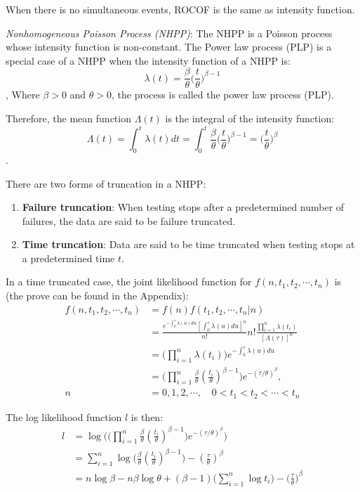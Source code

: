 \documentclass[12pt]{book}
\numberwithin{equation}{chapter}
\providecommand{\tightlist}{%
  \setlength{\itemsep}{0pt}\setlength{\parskip}{0pt}}
\begin{document}
When there is no simultaneous events, ROCOF is the same as intensity function.

\emph{Nonhomogeneous Poisson Process (NHPP)}: The NHPP is a Poisson process whose intensity function is non-constant. The Power law process (PLP) is a special case of a NHPP when the intensity function of a NHPP is:
\[\lambda(t) = \frac{\beta}{\theta}\bigg(\frac{t}{\theta}\bigg)^{\beta-1}\],
Where \(\beta > 0\) and \(\theta > 0\), the process is called the power law process (PLP).

Therefore, the mean function \(\Lambda(t)\) is the integral of the intensity function:
\[\Lambda(t) = \int_0^t \lambda(t)dt = \int_0^t \frac{\beta}{\theta}\bigg(\frac{t}{\theta}\bigg)^{\beta-1} = \bigg(\frac{t}{\theta}\bigg)^{\beta}\].

There are two forms of truncation in a NHPP:

\begin{enumerate}
\def\labelenumi{\arabic{enumi}.}
\tightlist
\item
  \textbf{Failure truncation}: When testing stops after a predetermined number of failures, the data are said to be failure truncated.
\item
  \textbf{Time truncation}: Data are said to be time truncated when testing stops at a predetermined time \(t\).
\end{enumerate}

In a time truncated case, the joint likelihood function for \(f(n, t_1, t_2, \cdots, t_n)\) is (the prove can be found in the Appendix):
\begin{equation}\label{pdftau}
\begin{aligned}
f(n, t_1, t_2, \cdots, t_n) & = f(n)f(t_1, t_2, \cdots, t_n|n)\\
& = \frac{e^{-\int_0^\tau \lambda(u)du}[\int_0^\tau \lambda(u)du]^n}{n!}n!\frac{\prod_{i=1}^n\lambda(t_i)}{[\Lambda(\tau)]^n}\\
& = \Big(\prod_{i=1}^n\lambda(t_i) \Big)e^{-\int_0^\tau \lambda(u)du}\\
& = \Big(\prod_{i=1}^n\frac{\beta}{\theta}(\frac{t_i}{\theta})^{\beta - 1} \Big)e^{-(\tau/\theta)^\beta},\\ 
n & = 0, 1, 2, \cdots, \quad  0 < t_1 < t_2 < \cdots < t_n
\end{aligned}
\end{equation}

The log likelihood function \(l\) is then:
\begin{equation}\label{logtau}
\begin{aligned}
l & = \log \Bigg(\Big(\prod_{i=1}^n\frac{\beta}{\theta}(\frac{t_i}{\theta})^{\beta - 1}\Big)e^{-(\tau/\theta)^\beta}\Bigg)\\
& = \sum_{i=1}^n\log\Big(\frac{\beta}{\theta}(\frac{t_i}{\theta})^{\beta - 1}\Big) - (\frac{\tau}{\theta})^\beta\\
& = n\log\beta - n\beta\log\theta + (\beta - 1)\bigg(\sum_{i=1}^n\log t_i\bigg) - \Big(\frac{\tau}{\theta}\Big)^\beta
\end{aligned}
\end{equation}
\end{document}
